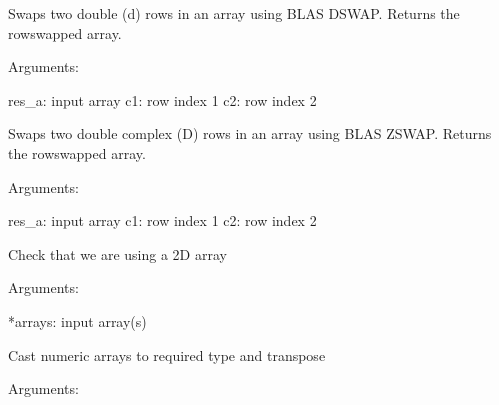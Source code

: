 \documentclass[a4paper,11pt,english]{sphinxmanual}
\begin{document}
\begin{fulllineitems}
\begin{fulllineitems}
\end{fulllineitems}


\begin{fulllineitems}
\label{modules_doc:cbmpy.PyscesStoich.MathArrayFunc.SwapRowd}
Swaps two double (d) rows in an array using BLAS DSWAP. Returns the rowswapped array.

Arguments:

res\_a: input array
c1: row index 1
c2: row index 2

\end{fulllineitems}


\begin{fulllineitems}
\label{modules_doc:cbmpy.PyscesStoich.MathArrayFunc.SwapRowz}
Swaps two double complex (D) rows in an array using BLAS ZSWAP. Returns the rowswapped array.

Arguments:

res\_a: input array
c1: row index 1
c2: row index 2

\end{fulllineitems}


\begin{fulllineitems}
\label{modules_doc:cbmpy.PyscesStoich.MathArrayFunc.assertRank2}
Check that we are using a 2D array

Arguments:

*arrays: input array(s)

\end{fulllineitems}


\begin{fulllineitems}
\label{modules_doc:cbmpy.PyscesStoich.MathArrayFunc.castCopyAndTranspose}
Cast numeric arrays to required type and transpose

Arguments:


\end{fulllineitems}
\end{fulllineitems}
\end{document}
